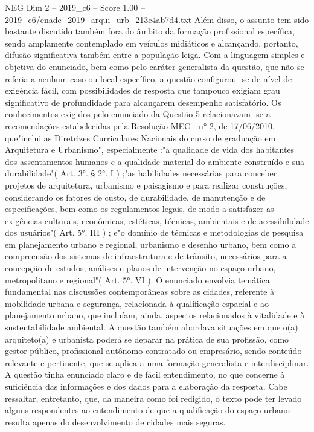 \begin{textsample}{NEG Dim 2 – 2019\_c6 – Score 1.00 – 2019\_c6/enade\_2019\_arqui\_urb\_213c4ab7d4.txt}
Além disso, o assunto tem sido bastante discutido também fora do âmbito da formação profissional específica, sendo amplamente contemplado em veículos midiáticos e alcançando, portanto, difusão significativa também entre a população leiga.
Com a linguagem simples e objetiva do enunciado, bem como pelo caráter generalista da questão, que não se referia a nenhum caso ou local específico, a questão configurou -se de nível de exigência fácil, com possibilidades de resposta que tampouco exigiam grau significativo de profundidade para alcançarem desempenho satisfatório.
Os conhecimentos exigidos pelo enunciado da Questão 5 relacionavam -se a recomendações estabelecidas pela Resolução MEC - n{\EmojiFont °} 2, de 17/06/2010, que"inclui as Diretrizes Curriculares Nacionais do curso de graduação em Arquitetura e Urbanismo", especialmente :"a qualidade de vida dos habitantes dos assentamentos humanos e a qualidade material do ambiente construído e sua durabilidade"( Art. 3{\EmojiFont °}. § 2{\EmojiFont °}.
I ) ;"as habilidades necessárias para conceber projetos de arquitetura, urbanismo e paisagismo e para realizar construções, considerando os fatores de custo, de durabilidade, de manutenção e de especificações, bem como os regulamentos legais, de modo a satisfazer as exigências culturais, econômicas, estéticas, técnicas, ambientais e de acessibilidade dos usuários"( Art. 5{\EmojiFont °}.
III ) ; e"o domínio de técnicas e metodologias de pesquisa em planejamento urbano e regional, urbanismo e desenho urbano, bem como a compreensão dos sistemas de infraestrutura e de trânsito, necessários para a concepção de estudos, análises e planos de intervenção no espaço urbano, metropolitano e regional"( Art. 5{\EmojiFont °}.
VI ).
O enunciado envolvia temática fundamental nas discussões contemporâneas sobre as cidades, referente à mobilidade urbana e segurança, relacionada à qualificação espacial e ao planejamento urbano, que incluíam, ainda, aspectos relacionados à vitalidade e à sustentabilidade ambiental.
A questão também abordava situações em que o(a) arquiteto(a) e urbanista poderá se deparar na prática de sua profissão, como gestor público, profissional autônomo contratado ou empresário, sendo conteúdo relevante e pertinente, que se aplica a uma formação generalista e interdisciplinar.
A questão tinha enunciado claro e de fácil entendimento, no que concerne à suficiência das informações e dos dados para a elaboração da resposta.
Cabe ressaltar, entretanto, que, da maneira como foi redigido, o texto pode ter levado alguns respondentes ao entendimento de que a qualificação do espaço urbano resulta apenas do desenvolvimento de cidades mais seguras.

\end{textsample}
